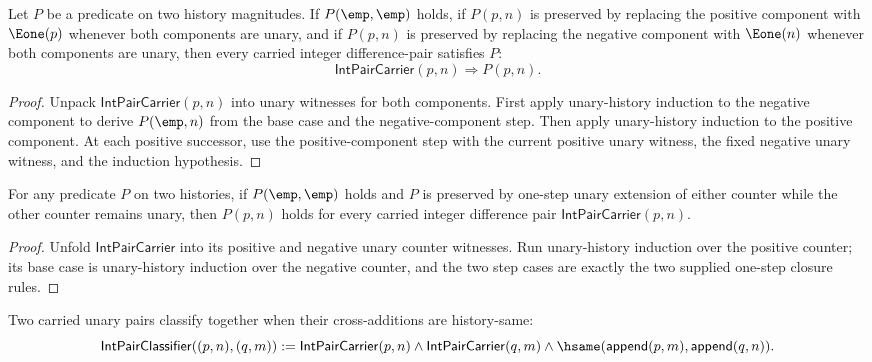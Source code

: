 \begin{theorem}
\label{thm:int-pair-carrier-magnitude-pair-induction}
Let \(P\) be a predicate on two history magnitudes. If \(P(\emp,\emp)\)
holds, if \(P(p,n)\) is preserved by replacing the positive component with
\(\Eone(p)\) whenever both components are unary, and if \(P(p,n)\) is preserved
by replacing the negative component with \(\Eone(n)\) whenever both components
are unary, then every carried integer difference-pair satisfies \(P\):
$$
\mathsf{IntPairCarrier}(p,n)\Longrightarrow P(p,n).
$$
\end{theorem}
\begin{proof}
Unpack \(\mathsf{IntPairCarrier}(p,n)\) into unary witnesses for both
components. First apply unary-history induction to the negative component to
derive \(P(\emp,n)\) from the base case and the negative-component step. Then
apply unary-history induction to the positive component. At each positive
successor, use the positive-component step with the current positive unary
witness, the fixed negative unary witness, and the induction hypothesis.
\end{proof}

\begin{theorem}
\label{thm:int-pair-carrier-pair-induction}
For any predicate \(P\) on two histories, if \(P(\emp,\emp)\) holds and
\(P\) is preserved by one-step unary extension of either counter while the
other counter remains unary, then \(P(p,n)\) holds for every carried integer
difference pair \(\mathsf{IntPairCarrier}(p,n)\).
\end{theorem}
\begin{proof}
Unfold \(\mathsf{IntPairCarrier}\) into its positive and negative unary
counter witnesses. Run unary-history induction over the positive counter; its
base case is unary-history induction over the negative counter, and the two
step cases are exactly the two supplied one-step closure rules.
\end{proof}

\begin{definition}
\label{def:intup-difference-pair-classifier}
Two carried unary pairs classify together when their cross-additions are
history-same:
$$
  \mathsf{IntPairClassifier}((p,n),(q,m))
  :=
  \mathsf{IntPairCarrier}(p,n)\land
  \mathsf{IntPairCarrier}(q,m)\land
  \hsame(\mathsf{append}(p,m),\mathsf{append}(q,n)).
$$
\end{definition}

